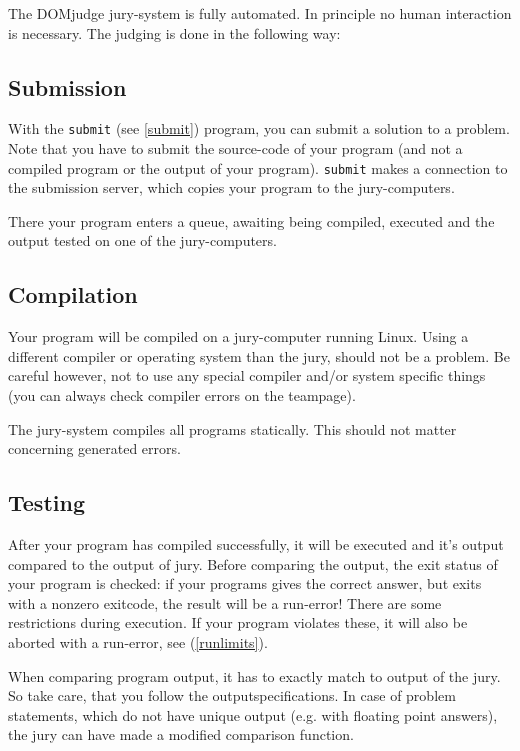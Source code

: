 \documentclass[11pt,a4paper]{article}
\newcommand{\DOMjudge}{\textsc{DOM}judge }
\begin{document}
The \DOMjudge jury-system is fully automated. In principle no human
interaction is necessary. The judging is done in the following way:

\subsection{Submission}

With the \texttt{submit} (see \ref{submit}) program, you can submit a
solution to a problem. Note that you have to submit the source-code of
your program (and not a compiled program or the output of your
program). \texttt{submit} makes a connection to the submission server,
which copies your program to the jury-computers.

There your program enters a queue, awaiting being compiled, executed
and the output tested on one of the jury-computers.

\subsection{Compilation}

Your program will be compiled on a jury-computer running Linux.
Using a different compiler or operating system than the jury, should
not be a problem. Be careful however, not to use any special compiler
and/or system specific things (you can always check compiler errors on
the teampage).

The jury-system compiles all programs statically. This should not
matter concerning generated errors.

\subsection{Testing}

After your program has compiled successfully, it will be executed and
it's output compared to the output of jury. Before comparing the
output, the exit status of your program is checked: if your programs
gives the correct answer, but exits with a nonzero exitcode, the
result will be a run-error! There are some restrictions during
execution. If your program violates these, it will also be aborted
with a run-error, see (\ref{runlimits}).

When comparing program output, it has to exactly match to output of
the jury. So take care, that you follow the outputspecifications. In
case of problem statements, which do not have unique output (e.g. with
floating point answers), the jury can have made a modified comparison
function.
\end{document}
